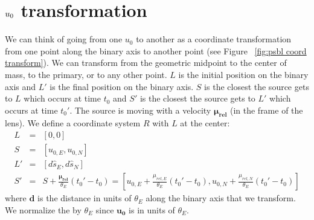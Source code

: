 \documentclass[twocolumn]{aastex701}
\newcommand{\vect}[1]{\boldsymbol{#1}}
\begin{document}
\section{$\lowercase{u}_0$ transformation}
\label{sec:u0}
We can think of going from one $u_0$ to another as a coordinate transformation from one point along the binary axis to another point (see Figure  ~\ref{fig:psbl coord transform}). We can transform from the geometric midpoint to the center of mass, to the primary, or to any other point. $L$ is the initial position on the binary axis and $L'$ is the final position on the binary axis. $S$ is the closest the source gets to $L$ which occurs at time $t_0$ and $S'$ is the closest the source gets to $L'$ which occurs at time $t_0'$. The source is moving with a velocity $\vect{\mu_{rel}}$ (in the frame of the lens). We define a coordinate system $R$ with $L$ at the center:
\begin{eqnarray}
    L &=& [0, 0] \\
    S &=& [u_{0, E}, u_{0, N}] \\
    L' &=& [d\hat{s}_E, d\hat{s}_N] \\
    S' &=& S + \frac{\vect{\mu_{rel}}}{\theta_E}(t_0' - t_0) = [u_{0, E} + \frac{\mu_{rel, E}}{\theta_E}(t_0' - t_0), u_{0, N} + \frac{\mu_{rel, N}}{\theta_E}(t_0' - t_0)]
\end{eqnarray}
where $\vect{d}$ is the distance in units of $\theta_E$ along the binary axis that we transform. We normalize the by $\theta_E$ since $\vect{u_0}$ is in units of $\theta_E$.
\end{document}
